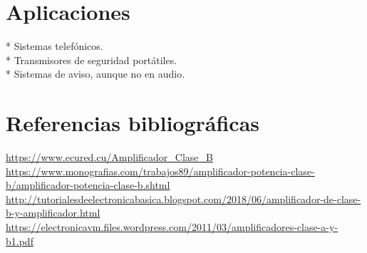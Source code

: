\documentclass[12pt,a4paper]{article}
\begin{document}
\section{Aplicaciones}
* Sistemas telefónicos.\\
* Transmisores de seguridad portátiles.\\
* Sistemas de aviso, aunque no en audio.\\

\section*{Referencias bibliográficas}
\url{https://www.ecured.cu/Amplificador_Clase_B}\\
\url{https://www.monografias.com/trabajos89/amplificador-potencia-clase-b/amplificador-potencia-clase-b.shtml}\\
\url{http://tutorialesdeelectronicabasica.blogspot.com/2018/06/amplificador-de-clase-b-y-amplificador.html}\\
\url{https://electronicavm.files.wordpress.com/2011/03/amplificadores-clase-a-y-b1.pdf}\\
\end{document}
